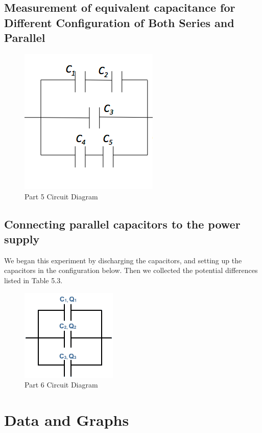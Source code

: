 \documentclass[titlepage]{article}
\begin{document}
        \subsection{Measurement of equivalent capacitance for Different Configuration of Both Series and Parallel}

        \begin{figure}[hbt!] 
            \centering
            \caption*{Part 5 Circuit Diagram}
            \includegraphics[scale=0.8]{images/procedure/part5.png}
        \end{figure} 
        

        \subsection{Connecting parallel capacitors to the power supply} 
        We began this experiment by discharging the capacitors, and setting up the capacitors in the configuration below. Then we collected the potential differences listed in Table 5.3. 


        \begin{figure}[hbt!] 
            \centering
            \caption*{Part 6 Circuit Diagram}
            \includegraphics[scale=1]{images/procedure/part6.png}
        \end{figure} 




	\section{Data and Graphs}
\end{document}
